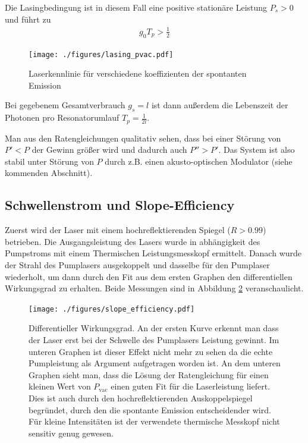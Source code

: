 \documentclass[11pt,twoside=true]{scrartcl}
\begin{document}
Die Lasingbedingung ist in diesem Fall eine positive stationäre Leistung
$P_s > 0$ und führt zu
%
\begin{align*}
  g_0 T_p > \frac{1}{2}
\end{align*}
%
\begin{figure}
  \centering
  \texttt{[image: ./figures/lasing\_pvac.pdf]}
  \caption{Laserkennlinie für verschiedene koeffizienten der spontanten
  Emission}
  \label{fig:lasing_pvac}
\end{figure}

Bei gegebenem Gesamtverbrauch $g_s=l$ ist dann außerdem die Lebenszeit der Photonen
pro Resonatorumlauf $T_p = \frac{1}{2 l}$. 

Man aus den Ratengleichungen qualitativ sehen, dass bei einer Störung von $P'<P$
der Gewinn größer wird und dadurch auch $P'' > P'$. Das System ist also stabil unter
Störung von $P$ durch z.B. einen akusto-optischen Modulator (siehe kommenden Abschnitt).

\newpage


\subsection{Schwellenstrom und Slope-Efficiency}
Zuerst wird der Laser mit einem hochreflektierenden Spiegel ($R > 0.99$) betrieben.
Die Ausgangsleistung des Lasers wurde in abhängigkeit des Pumpstroms mit einem 
Thermischen Leistungsmesskopf ermittelt. Danach wurde der Strahl des Pumplasers
ausgekoppelt und dasselbe für den Pumplaser wiederholt, um dann durch den Fit
aus dem ersten Graphen den differentiellen Wirkungsgrad zu erhalten. Beide
Messungen sind in Abbildung \ref{fig:slope_efficiency} veranschaulicht.

\begin{figure}
  \centering
  \texttt{[image: ./figures/slope\_efficiency.pdf]}
  \caption{Differentieller Wirkungsgrad. An der ersten Kurve erkennt man
  dass der Laser erst bei der Schwelle des Pumplasers Leistung gewinnt. Im
  unteren Graphen ist dieser Effekt nicht mehr zu sehen da die echte
  Pumpleistung als Argument aufgetragen worden ist. An dem unteren Graphen
  sieht man, dass die Lösung der Ratengleichung für einen kleinen Wert von
  $P_\text{vac}$ einen guten Fit für die Laserleistung liefert. Dies ist auch
  durch den hochreflektierenden Auskoppelspiegel begründet, durch den die
  spontante Emission entscheidender wird.  Für kleine Intensitäten ist der
  verwendete thermische Messkopf nicht sensitiv genug gewesen.}

  \label{fig:slope_efficiency}
\end{figure}
\end{document}

